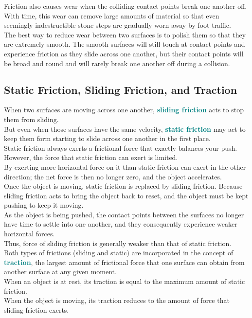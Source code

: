 \documentclass[12pt]{article}
\theoremstyle{definition}
\newcommand{\defnterm}[1]{\textbf{\textcolor{teal}{#1}}\index{#1}}
\begin{document}
Friction also causes wear when the colliding contact points break one another off.
With time, this wear can remove large amounts of material so that even seemingly indestructible stone steps are gradually worn away by foot traffic. \\
The best way to reduce wear between two surfaces is to polish them so that they are extremely smooth.
The smooth surfaces will still touch at contact points and experience friction as they slide across one another, but their contact points will be broad and round and will rarely break one another off during a collision.

\subsection{Static Friction, Sliding Friction, and Traction}
When two surfaces are moving across one another, \defnterm{sliding friction} acts to stop them from sliding. \\

But even when those surfaces have the same velocity, \defnterm{static friction} may act to keep them form starting to slide across one another in the first place. \\
Static friction always exerts a frictional force that exactly balances your push.
However, the force that static friction can exert is limited. \\

By exerting more horizontal force on it than static friction can exert in the other direction;
the net force is then no longer zero, and the object accelerates. \\
Once the object is moving, static friction is replaced by sliding friction.
Because sliding friction acts to bring the object back to reset, and the object must be kept pushing to keep it moving. \\
As the object is being pushed, the contact points between the surfaces no longer have time to settle into one another, and they consequently experience weaker horizontal forces. \\
Thus, force of sliding friction is generally weaker than that of static friction. \\

Both types of frictions (sliding and static) are incorporated in the concept of \defnterm{traction}, the largest amount of frictional force that one surface can obtain from another surface at any given moment. \\
When an object is at rest, its traction is equal to the maximum amount of static friction. \\
When the object is moving, its traction reduces to the amount of force that sliding friction exerts. \\
\end{document}
